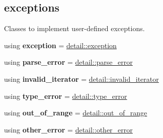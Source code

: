 \subsection*{exceptions}
\label{_amgrp19ad27801b95bd1f2c6c2bf83dbb7515}%
Classes to implement user-\/defined exceptions. \begin{DoxyCompactItemize}
\item 
\mbox{\label{classnlohmann_1_1basic__json_a14824c27188d2fee4861806cd5f23d22}} 
using {\bfseries exception} = \hyperlink{classnlohmann_1_1detail_1_1exception}{detail\+::exception}
\item 
\mbox{\label{classnlohmann_1_1basic__json_a555b05e9da63d486126759922685a37a}} 
using {\bfseries parse\+\_\+error} = \hyperlink{classnlohmann_1_1detail_1_1parse__error}{detail\+::parse\+\_\+error}
\item 
\mbox{\label{classnlohmann_1_1basic__json_a6ccc9788413fd58de998fe92743cb4aa}} 
using {\bfseries invalid\+\_\+iterator} = \hyperlink{classnlohmann_1_1detail_1_1invalid__iterator}{detail\+::invalid\+\_\+iterator}
\item 
\mbox{\label{classnlohmann_1_1basic__json_ace5bf851eafe85bd6332f978991bc11c}} 
using {\bfseries type\+\_\+error} = \hyperlink{classnlohmann_1_1detail_1_1type__error}{detail\+::type\+\_\+error}
\item 
\mbox{\label{classnlohmann_1_1basic__json_a2251d8523fa6d16c0fba6388ffa2ef8c}} 
using {\bfseries out\+\_\+of\+\_\+range} = \hyperlink{classnlohmann_1_1detail_1_1out__of__range}{detail\+::out\+\_\+of\+\_\+range}
\item 
\mbox{\label{classnlohmann_1_1basic__json_a6fc373c99facc37aadbc5651b3d6631d}} 
using {\bfseries other\+\_\+error} = \hyperlink{classnlohmann_1_1detail_1_1other__error}{detail\+::other\+\_\+error}
\end{DoxyCompactItemize}
